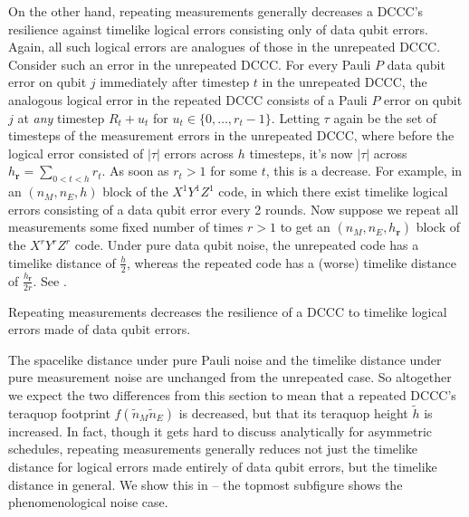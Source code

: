 On the other hand, repeating measurements generally decreases a DCCC's resilience against timelike logical errors consisting only of data qubit errors.
Again, all such logical errors are analogues of those in the unrepeated DCCC.
Consider such an error in the unrepeated DCCC.
For every Pauli $P$ data qubit error on qubit $j$ immediately after timestep $t$ in the unrepeated DCCC,
the analogous logical error in the repeated DCCC consists of a Pauli $P$ error on qubit $j$ at \emph{any} timestep $R_t + u_t$ for $u_t \in \{0, \ldots, r_t - 1\}$.
Letting $\tau$ again be the set of timesteps of the measurement errors in the unrepeated DCCC,
where before the logical error consisted of $|\tau|$ errors across $h$ timesteps,
it's now $|\tau|$ across $h_{\mathbf{r}} = \sum_{0 < t < h} r_t$.
As soon as $r_t > 1$ for some $t$, this is a decrease.
For example, in an $(n_M, n_E, h)$ block of the $X^1 Y^1 Z^1$ code,
in which there exist timelike logical errors consisting of a data qubit error every 2 rounds.
Now suppose we repeat all measurements some fixed number of times $r > 1$ to get an $(n_M, n_E, h_{\mathbf{r}})$ block of the $X^r Y^r Z^r$ code.
Under pure data qubit noise, the unrepeated code has a timelike distance of $\frac{h}{2}$,
whereas the repeated code has a (worse) timelike distance of $\frac{h_{\mathbf{r}}}{2r}$.
See .


\begin{difference}\label{dif:repeated_timelike_logicals}
Repeating measurements decreases the resilience of a DCCC to timelike logical errors made of data qubit errors.
\end{difference}

The spacelike distance under pure Pauli noise and the timelike distance under pure measurement noise are unchanged from the unrepeated case.
So altogether we expect the two differences from this section to mean that a repeated DCCC's teraquop footprint $f(\tilde{n}_M \tilde{n}_E)$ is decreased, but that its teraquop height $\tilde{h}$ is increased.
In fact, though it gets hard to discuss analytically for asymmetric schedules, repeating measurements generally reduces not just the timelike distance for logical errors made entirely of data qubit errors, but the timelike distance in general.
We show this in  -- the topmost subfigure shows the phenomenological noise case.



